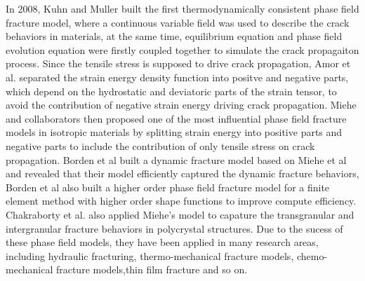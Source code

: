 \documentclass[3p,10pt,sort&compress]{elsarticle}
\begin{document}
In 2008, Kuhn and Muller \cite{kuhn2008phase} built the first thermodynamically consistent phase field fracture model, where a continuous variable field was used to describe the crack behaviors in materials, at the same time, equilibrium equation and phase field evolution equation were firstly coupled together to simulate the crack propagaiton process. Since the tensile stress is supposed to drive crack propagation, Amor et al. \cite{amor2009regularized} separated the strain energy density function into positve and negative parts, which depend on the hydrostatic and deviatoric parts of the strain tensor, to avoid the  contribution of negative strain energy driving crack propagation. Miehe and collaborators\cite{miehe2010phase,miehe2010thermodynamically} then proposed one of the most influential phase field fracture models in isotropic materials by splitting strain energy into positive parts and negative parts to include the contribution of only tensile stress on crack propagation. Borden et al\cite{borden2012phase} built a dynamic fracture model based on Miehe et al\cite{miehe2010phase,miehe2010thermodynamically} and revealed that their model efficiently captured the dynamic fracture behaviors, Borden et al\cite{borden2014higher} also built a higher order phase field fracture model for a finite element method with higher order shape functions to improve compute efficiency. Chakraborty et al.\cite{chakraborty2016multi,chakraborty2016phase} also applied Miehe's model to capature the transgranular and intergranular fracture behaviors in polycrystal structures. Due to the sucess of these phase field models, they have been applied in many research areas, including hydraulic fracturing\cite{wilson2016phase,miehe2016phase}, thermo-mechanical fracture models\cite{bourdin2014morphogenesis,schluter2017phase,miehe2015phase,chu2017study}, chemo-mechanical fracture models\cite{zhang2016variational,zuo2016phase},thin film fracture\cite{baldelli2013fracture,sicsic2014initiation} and so on.
\end{document}
